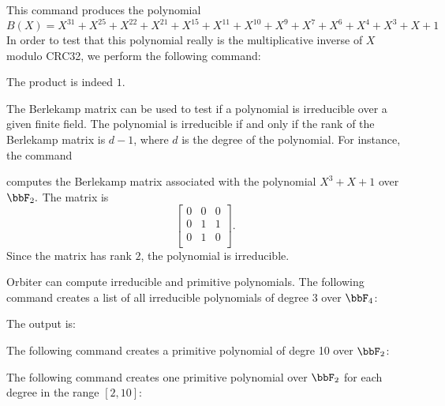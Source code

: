 


This command produces the polynomial 
$$
B(X)=X^{31} + X^{25} + X^{22} + X^{21} + X^{15} + X^{11} + X^{10} + X^{9} + X^{7} + X^{6} + X^{4} + X^{3} + X + 1
$$
In order to test that this polynomial really 
is the multiplicative inverse of $X$ modulo CRC32, 
we perform the following command:




The product is indeed $1$.


\bigskip




The Berlekamp matrix can be used to test if 
a polynomial is irreducible over a given finite field.
The polynomial is irreducible if and only if the rank of 
the Berlekamp matrix is $d-1$, where $d$ is the degree of the polynomial.
For instance, the command


computes the Berlekamp matrix associated 
with the polynomial $X^3+X+1$ over $\bbF_2.$ 
The matrix is 
$$
\left[
\begin{array}{ccc}
0 &0 &0\\ 
0 &1 &1 \\
0 &1 &0 \\
\end{array}
\right].
$$
Since the matrix has rank $2$, the polynomial is irreducible.

\bigskip




Orbiter can compute irreducible and primitive polynomials.
The following command creates a list of all irreducible polynomials of 
degree $3$ over $\bbF_4$:


The output is:

\bigskip

The following command creates a primitive polynomial of degre 10 over $\bbF_2$:




\bigskip

The following command creates one primitive polynomial 
over $\bbF_2$ for each degree in the range $[2,10]$:

